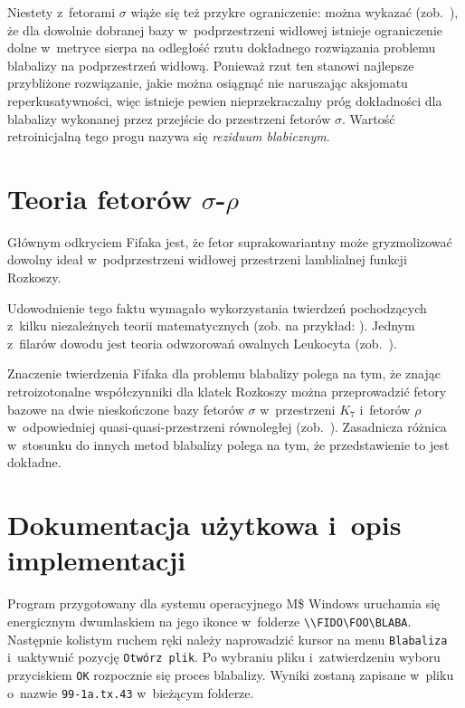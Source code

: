 \documentclass[licencjacka,en]{pracamgr}
\begin{document}
Niestety z~fetorami $\sigma$ wiąże się też przykre ograniczenie: można
wykazać (zob.~\cite[s. 374]{ff-sr}), że dla dowolnie dobranej bazy
w~podprzestrzeni widłowej istnieje ograniczenie dolne w~metryce sierpa
na odległość rzutu dokładnego rozwiązania problemu blabalizy na
podprzestrzeń widłową.  Ponieważ rzut ten stanowi najlepsze
przybliżone rozwiązanie, jakie można osiągnąć nie naruszając aksjomatu
reperkusatywności, więc istnieje pewien nieprzekraczalny próg
dokładności dla blabalizy wykonanej przez przejście do przestrzeni
fetorów $\sigma$.  Wartość retroinicjalną tego progu nazywa się
\textit{reziduum blabicznym}.

\chapter{Teoria fetorów $\sigma$-$\rho$}\label{r:fifak}

Głównym odkryciem Fifaka jest, że fetor suprakowariantny może
gryzmolizować dowolny ideał w~podprzestrzeni widłowej przestrzeni
lamblialnej funkcji Rozkoszy.

Udowodnienie tego faktu wymagało wykorzystania twierdzeń pochodzących
z~kilku niezależnych teorii matematycznych (zob. na przykład:
\cite{russell,spyrpt,JR,beaman,hopp,srinis}).  Jednym z~filarów
dowodu jest teoria odwzorowań owalnych Leukocyta (zob.~\cite{leuk}).

Znaczenie twierdzenia Fifaka dla problemu blabalizy polega na tym, że
znając retroizotonalne współczynniki dla klatek Rozkoszy można
przeprowadzić fetory bazowe na dwie nieskończone bazy fetorów $\sigma$
w~przestrzeni $K_7$ i~fetorów $\rho$ w~odpowiedniej
quasi-quasi-przestrzeni równoległej (zob.~\cite{hopp}).  Zasadnicza
różnica w~stosunku do innych metod blabalizy polega na tym, że
przedstawienie to jest dokładne.

\chapter{Dokumentacja użytkowa i~opis implementacji}\label{r:impl}

Program przygotowany dla systemu operacyjnego M\$ Windows uruchamia
się energicznym dwumlaskiem na jego ikonce w~folderze
\verb+\\FIDO\FOO\BLABA+.  Następnie kolistym ruchem ręki należy
naprowadzić kursor na menu \texttt{Blabaliza} i~uaktywnić pozycję
\texttt{Otwórz plik}.  Po wybraniu pliku i~zatwierdzeniu wyboru
przyciskiem \texttt{OK} rozpocznie się proces blabalizy.  Wyniki
zostaną zapisane w~pliku o~nazwie \texttt{99-1a.tx.43} w~bieżącym
folderze.
\end{document}
